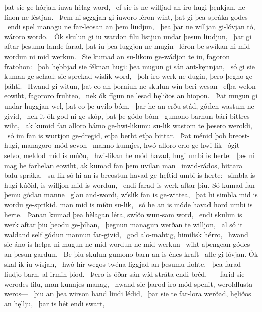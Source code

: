 þat sie ge-hórjan iuwa hèlag word, \hld\ ef sie is ne willjad an iro hugi þęnkjan,
ne línon ne léstjan. \hld\ Þem ni sęggjan gi iuworo léron wiht,
þat gi þea spráka godes \hld\ endi spel managu
ne far-leosan an þem liudjun, \hld\ þea þar ne willjan gi-lóvjan tó,
wároro wordo. \hld\ Ók skulun gi iu wardon filu
listjun undar þesun liudjun, \hld\ þar gi aftar þesumu lande farad,
þat iu þea luggjon ne mugin \hld\ léron be-swíkan
ni mid wordun ni mid werkun. \hld\ Sie kumad an su-likom ge-wádjon te iu,
fagoron fratohon: \hld\ þoh hębbjad sie féknan hugi:
þea mugun gi sán ant-kęnnjan, \hld\ só gi sie kuman ge-sehad:
sie sprekad wíslík word, \hld\ þoh iro werk ne dugin,
þero þegno ge-þáhti. \hld\ Hwand gi witun, þat eo an þorniun ne skulun
wín-beri wesan \hld\ efþa welon eowiht,
fagororo fruhteo, \hld\ nek ók fígun ne lesad
hęliðos an hiopon. \hld\ Þat mugun gi undar-huggjan wel,
þat eo þe uvilo bóm, \hld\ þar he an erðu stád,
góden wastum ne givid, \hld\ nek it ók god ni ge-skóp,
þat þe gódo bóm \hld\ gumono barnun
bári bittres wiht, \hld\ ak kumid fan alloro bámo ge-hwi-likumu
su-lik wastom te þesero weroldi, \hld\ só im fan is wurtjon ge-dregid,
etþa berht etþa bittar. \hld\ Þat ménid þoh breost-hugi,
managoro mód-sevon \hld\ manno kunnjes,
hwó alloro erlo ge-hwi-lik \hld\ ógit selvo,
meldod mid is múðu, \hld\ hwi-likan he mód havad,
hugi umbi is herte: \hld\ þes ni mag he farhelan eowiht,
ak kumad fan þem uvilan man \hld\ inwid-rádos,
bittara balu-spráka, \hld\ su-lik só hi an is breostun havad
ge-hęftid umbi is herte: \hld\ simbla is hugi kúðid,
is willjon mid is wordun, \hld\ endi farad is werk aftar þiu.
Só kumad fan þemu gódan manne \hld\ glau and-wordi,
wíslík fan is ge-wittea, \hld\ þat hi simbla mid is wordu ge-sprikid,
man mid is míðu su-lik, \hld\ só he an is móde havad
hord umbi is herte. \hld\ Þanan kumad þea hèlagan léra,
swíðo wun-sam word, \hld\ endi skulun is werk aftar þiu
þeodu ge-þíhan, \hld\ þegnun managun
werðan te willjon, \hld\ al só it waldand self
gódun mannun far-givid, \hld\ god alo-mahtig,
himilisk hérro, \hld\ hwand sie áno is helpa ni mugun
ne mid wordun ne mid werkun \hld\ wiht aþengean
gódes an þesun gardun. \hld\ Be-þiu skulun gumono barn
an is énes kraft \hld\ alle gi-lóvjan.
Ók skal ik iu wísjan, \hld\ hwó hír wegos twéna
liggjad an þesumu liohte, \hld\ þea farad liudjo barn,
al irmin-þiod. \hld\ Þero is óðar sán
wíd stráta endi bréd, \hld\ —farid sie werodes filu,
man-kunnjes manag, \hld\ hwand sie þarod iro mód spenit,
weroldlusta weros— \hld\ þiu an þea wirson hand
liudi lédid, \hld\ þar sie te far-lora werðad,
hęliðos an hęllju, \hld\ þar is hét endi swart,
